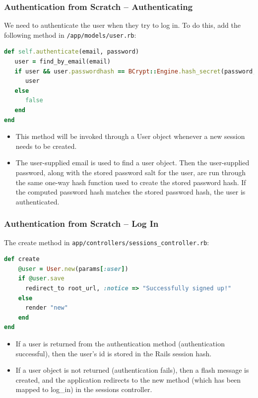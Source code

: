 \documentclass[t,handout]{beamer}
\begin{document}
\begin{frame}[fragile]\frametitle{Authentication from Scratch -- Authenticating}
\vspace*{-0.1in}
{\small
We need to authenticate the user when they try to log in.  To do this, add the following method in
{\tt /app/models/user.rb}:
\begin{lstlisting}[frame=none,language=Ruby,basicstyle=\scriptsize\ttfamily\color{black}]
def self.authenticate(email, password) 
   user = find_by_email(email)
   if user && user.passwordhash == BCrypt::Engine.hash_secret(password, user.password_salt) 
      user
   else 
      false
   end 
end
\end{lstlisting}
 \begin{itemize} 
   \pause
   \item This method will be invoked through a User object whenever a new session needs to be created.
   \pause
   \item The user-supplied email  is used to find a user object. \pause Then the user-supplied password, along with the stored password salt for the user, are run 
   through the same one-way hash function used to create the stored password hash.  \pause If the computed password hash matches the stored password hash, 
   the user is authenticated.
 \end{itemize}}
\end{frame}  

\begin{frame}[fragile]\frametitle{Authentication from Scratch -- Log In}
{\small
The create method in {\tt app/controllers/sessions\_controller.rb}:
\begin{lstlisting}[frame=none,language=Ruby,basicstyle=\scriptsize\ttfamily\color{black},	xleftmargin=0pt]
def create
    @user = User.new(params[:user])
    if @user.save
      redirect_to root_url, :notice => "Successfully signed up!" 
    else
      render "new"
    end
end
\end{lstlisting}
\pause
\begin{itemize}
 \item If a user is returned from the authentication method (authentication successful), then the user's id is stored in the Rails session hash.
 \pause
 \item If a user object is not returned (authentication fails), then a flash message is created, and the application redirects to the new method (which has been mapped to log\_in) in the sessions controller.
\end{itemize}
}
\end{frame}
\end{document}
